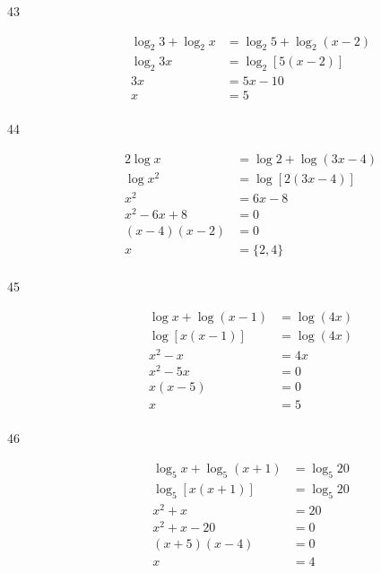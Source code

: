 \documentclass{exam}
\begin{document}
\begin{description}
      \item[43] 
        \begin{align*}
          \log_2 3 + \log_2 x &= \log_2 5 + \log_2(x - 2) \\
          \log_2 3x           &= \log_2 [5 (x - 2)] \\
          3x                  &= 5x - 10 \\
          x                   &= \boxed{5} \\
        \end{align*}

      \item[44] 
        \begin{align*}
          2 \log x       &= \log 2 + \log(3x - 4) \\
          \log x^2       &= \log [2(3x - 4)] \\
          x^2            &= 6x - 8 \\
          x^2 - 6x + 8   &= 0 \\
          (x - 4)(x - 2) &= 0 \\
          x              &= \boxed{\{2, 4\}} \\
        \end{align*}

      \item[45] 
        \begin{align*}
          \log x + \log(x - 1) &= \log (4x) \\
          \log [x(x - 1)]      &= \log (4x) \\
          x^2 - x              &= 4x \\
          x^2 - 5x             &= 0 \\
          x(x - 5)             &= 0 \\
          x                    &= \boxed{5} \\
        \end{align*}

      \item[46] 
        \begin{align*}
          \log_5 x + \log_5(x + 1) &= \log_5 20 \\
          \log_5 [x(x + 1)]        &= \log_5 20 \\
          x^2 + x                  &= 20 \\
          x^2 + x - 20             &= 0 \\
          (x + 5)(x - 4)           &= 0 \\
          x                        &= \boxed{4} \\
        \end{align*}


\end{description}
\end{document}
